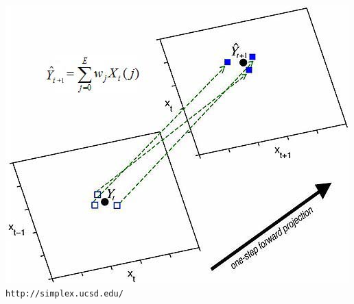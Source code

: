 \documentclass[11pt,compress,aspectratio=1610]{beamer}
\begin{document}
\begin{frame}
\begin{center}
    \includegraphics[width=\textwidth,height=0.95\textheight,keepaspectratio=true]{../images/simplex.jpg}
    \\
    {\scriptsize \texttt{http://simplex.ucsd.edu/} }
\end{center}
\end{frame}
\end{document}
